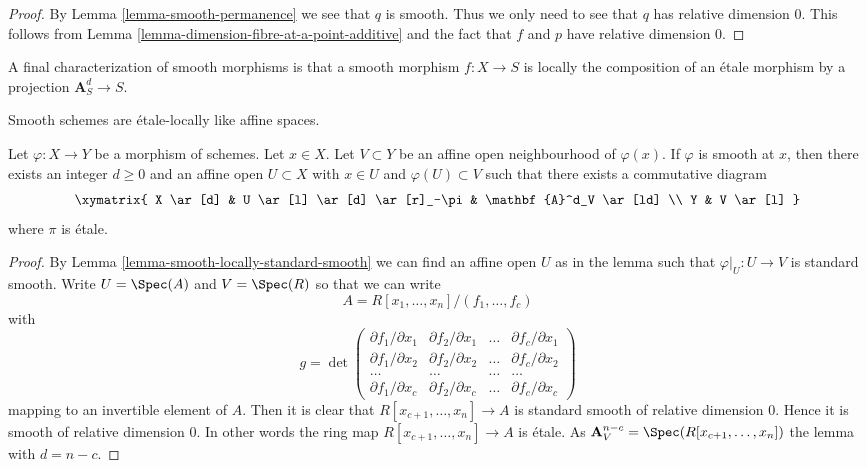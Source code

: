 \begin{proof}
By Lemma \ref{lemma-smooth-permanence} we see that $q$ is smooth.
Thus we only need to see that $q$ has relative dimension $0$.
This follows from Lemma \ref{lemma-dimension-fibre-at-a-point-additive}
and the fact that $f$ and $p$ have relative dimension $0$.
\end{proof}

\noindent
A final characterization of smooth morphisms is that a smooth morphism
$f : X \to S$ is locally the composition of an \'etale morphism by a projection
$\mathbf{A}_S^d \to S$.

\begin{lemma}
\label{lemma-smooth-etale-over-affine-space}
\begin{slogan}
Smooth schemes are \'etale-locally like affine spaces.
\end{slogan}
Let $\varphi : X \to Y$ be a morphism of schemes. Let $x \in X$.
Let $V \subset Y$ be an affine open neighbourhood of $\varphi(x)$.
If $\varphi$ is smooth at $x$, then there exists an integer $d \geq 0$
and an affine open $U \subset X$ with $x \in U$ and
$\varphi(U) \subset V$ such that there exists a commutative diagram
$$
\xymatrix{
X \ar[d] & U \ar[l] \ar[d] \ar[r]_-\pi & \mathbf{A}^d_V \ar[ld] \\
Y & V \ar[l]
}
$$
where $\pi$ is \'etale.
\end{lemma}

\begin{proof}
By
Lemma \ref{lemma-smooth-locally-standard-smooth}
we can find an affine open $U$ as in the lemma such that
$\varphi|_U : U \to V$ is standard smooth. Write
$U = \Spec(A)$ and $V = \Spec(R)$ so that we can write
$$
A = R[x_1, \ldots, x_n]/(f_1, \ldots, f_c)
$$
with
$$
g =
\det
\left(
\begin{matrix}
\partial f_1/\partial x_1 &
\partial f_2/\partial x_1 &
\ldots &
\partial f_c/\partial x_1 \\
\partial f_1/\partial x_2 &
\partial f_2/\partial x_2 &
\ldots &
\partial f_c/\partial x_2 \\
\ldots & \ldots & \ldots & \ldots \\
\partial f_1/\partial x_c &
\partial f_2/\partial x_c &
\ldots &
\partial f_c/\partial x_c
\end{matrix}
\right)
$$
mapping to an invertible element of $A$. Then it is clear that
$R[x_{c + 1}, \ldots, x_n] \to A$ is standard smooth of relative
dimension $0$. Hence it is smooth of relative dimension $0$.
In other words the ring map $R[x_{c + 1}, \ldots, x_n] \to A$
is \'etale. As $\mathbf{A}^{n - c}_V = \Spec(R[x_{c + 1}, \ldots, x_n])$
the lemma with $d = n - c$.
\end{proof}
















